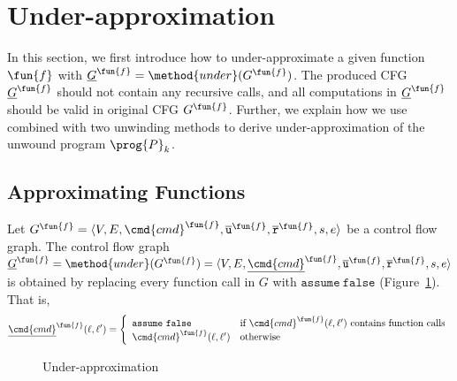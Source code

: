 
\section{Under-approximation}\label{sec:under-approximation}
In this section, we first introduce how to under-approximate a given function
$\fun{f}$ with $\underline{G}^\fun{f}=\method{under}(G^\fun{f})$.
The produced CFG $\underline{G}^\fun{f}$ should not contain any recursive calls,
and all computations in $\underline{G}^\fun{f}$ should be valid in original CFG
$G^\fun{f}$.
Further, we explain how we use  combined with two unwinding
methods to derive under-approximation of the unwound program $\prog{P}_k$.


\subsection{Approximating Functions}
Let $G^\fun{f} = \langle V, E, \cmd{cmd}^\fun{f}, \overline{\texttt{u}}^\fun{f},
\overline{\texttt{r}}^\fun{f},s,e \rangle$ be a control flow graph.
The control flow graph $\underline{G}^\fun{f} = \method{under}(G^\fun{f}) = 
\langle V, E,\underline{\cmd{cmd}}^\fun{f}, \overline{\texttt{u}}^\fun{f},
\overline{\texttt{r}}^\fun{f},s,e \rangle$ is obtained by replacing every
function call in $G$ with $\mathtt{assume\ false}$
(Figure~\ref{figure:under-approximation}).
That is,
\begin{equation*}
  \underline{\cmd{cmd}}^\fun{f} (\ell, \ell') =
  \left\{
    \begin{array}{ll}
      \mathtt{assume\ false} &
      \text{if } \cmd{cmd}^\fun{f} (\ell, \ell')
      \text{ contains function calls}\\
      \cmd{cmd}^\fun{f} (\ell, \ell') &
      \text{otherwise}
    \end{array}
  \right.
\end{equation*}

\begin{figure}[t]
  \centering

  \caption{Under-approximation}
  \label{figure:under-approximation}
\end{figure}

